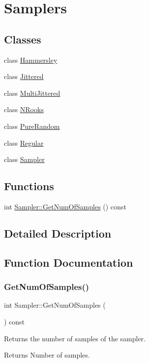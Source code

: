 \hypertarget{group___samplers}{}\section{Samplers}
\label{group___samplers}
\subsection*{Classes}
\begin{DoxyCompactItemize}
\item 
class \hyperlink{class_hammersley}{Hammersley}
\item 
class \hyperlink{class_jittered}{Jittered}
\item 
class \hyperlink{class_multi_jittered}{Multi\+Jittered}
\item 
class \hyperlink{class_n_rooks}{N\+Rooks}
\item 
class \hyperlink{class_pure_random}{Pure\+Random}
\item 
class \hyperlink{class_regular}{Regular}
\item 
class \hyperlink{class_sampler}{Sampler}
\end{DoxyCompactItemize}
\subsection*{Functions}
\begin{DoxyCompactItemize}
\item 
int \hyperlink{group___samplers_ga3d438d62d7b7eaec05cff684f96cfe02}{Sampler\+::\+Get\+Num\+Of\+Samples} () const
\end{DoxyCompactItemize}


\subsection{Detailed Description}


\subsection{Function Documentation}
\hypertarget{group___samplers_ga3d438d62d7b7eaec05cff684f96cfe02}{}\label{group___samplers_ga3d438d62d7b7eaec05cff684f96cfe02} 
\subsubsection{\texorpdfstring{Get\+Num\+Of\+Samples()}{GetNumOfSamples()}}
{\footnotesize\ttfamily int Sampler\+::\+Get\+Num\+Of\+Samples (\begin{DoxyParamCaption}{ }\end{DoxyParamCaption}) const\hspace{0.3cm}{\ttfamily [inline]}}

Returns the number of samples of the sampler. \begin{DoxyReturn}{Returns}
Number of samples. 
\end{DoxyReturn}
